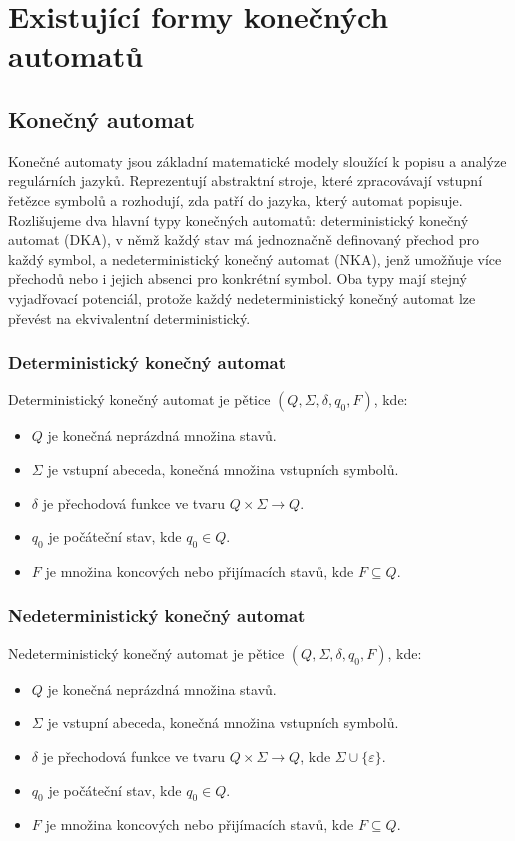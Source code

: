 \chapter{Existující formy konečných automatů}

\section{Konečný automat}

Konečné automaty jsou základní matematické modely sloužící k popisu a analýze
regulárních jazyků. Reprezentují abstraktní stroje, které zpracovávají vstupní
řetězce symbolů a rozhodují, zda patří do jazyka, který automat popisuje.
Rozlišujeme dva hlavní typy konečných automatů: deterministický konečný automat
(DKA), v němž každý stav má jednoznačně definovaný přechod pro každý symbol, a
nedeterministický konečný automat (NKA), jenž umožňuje více přechodů nebo i
jejich absenci pro konkrétní symbol. Oba typy mají stejný vyjadřovací
potenciál, protože každý nedeterministický konečný automat lze převést na
ekvivalentní deterministický.

\subsection{Deterministický konečný automat}

Deterministický konečný automat je pětice \((Q, \Sigma, \delta, q_0, F)\), kde:
\begin{itemize}
    \item \(Q\) je konečná neprázdná množina stavů.
    \item \(\Sigma\) je vstupní abeceda, konečná množina vstupních symbolů.
    \item \(\delta\) je přechodová funkce ve tvaru
        \(Q \times \Sigma \rightarrow Q\).
    \item \(q_0\) je počáteční stav, kde \(q_0 \in Q\).
    \item \(F\) je množina koncových nebo přijímacích stavů, kde
        \(F \subseteq Q\).
\end{itemize}

\subsection{Nedeterministický konečný automat}

Nedeterministický konečný automat je pětice \((Q, \Sigma,\delta, q_0, F)\),
kde:
\begin{itemize}
    \item \(Q\) je konečná neprázdná množina stavů.
    \item \(\Sigma\) je vstupní abeceda, konečná množina vstupních symbolů.
    \item \(\delta\) je přechodová funkce ve tvaru
        \(Q \times \Sigma \rightarrow Q\), kde \(\Sigma \cup \{\varepsilon\}\).
    \item \(q_0\) je počáteční stav, kde \(q_0 \in Q\).
    \item \(F\) je množina koncových nebo přijímacích stavů, kde
        \(F \subseteq Q\).
\end{itemize}

